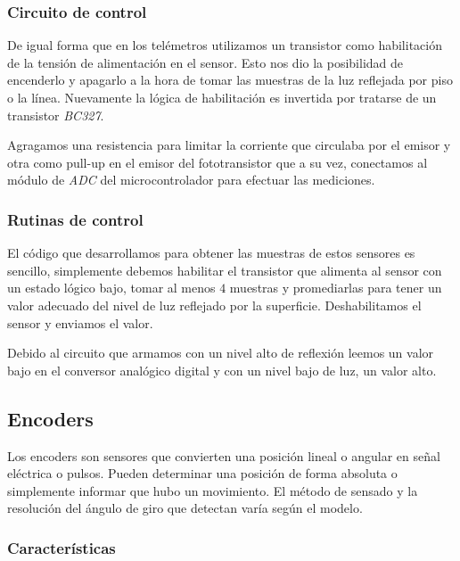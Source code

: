 \subsubsection{Circuito de control}
\label{h_sensado_piso_circuito}

De igual forma que en los tel\'emetros utilizamos un transistor como habilitaci\'on de la tensi\'on de alimentaci\'on en el sensor.
Esto nos dio la posibilidad de encenderlo y apagarlo a la hora de tomar las muestras de la luz reflejada por piso o la l\'inea.
Nuevamente la l\'ogica de habilitaci\'on es invertida por tratarse de un transistor \emph{BC327}.

Agragamos una resistencia para limitar la corriente que circulaba por el emisor y otra como pull-up en el emisor del fototransistor
que a su vez, conectamos al m\'odulo de \emph{ADC} del microcontrolador para efectuar las mediciones.

\subsubsection{Rutinas de control}
\label{h_sensado_piso_rutinas}

El c\'odigo que desarrollamos para obtener las muestras de estos sensores es sencillo, simplemente debemos habilitar el
transistor que alimenta al sensor con un estado l\'ogico bajo, tomar al menos $4$ muestras y promediarlas para tener un
valor adecuado del nivel de luz reflejado por la superficie.
Deshabilitamos el sensor y enviamos el valor.

Debido al circuito que armamos con un nivel alto de reflexi\'on leemos un valor bajo en el conversor anal\'ogico digital y
con un nivel bajo de luz, un valor alto.

\subsection{Encoders}
\label{h_sensado_encoder}

Los encoders son sensores que convierten una posici\'on lineal o angular en se\~nal el\'ectrica o pulsos.
Pueden determinar una posici\'on de forma absoluta o simplemente informar que hubo un movimiento.
El m\'etodo de sensado y la resoluci\'on del \'angulo de giro que detectan var\'ia seg\'un el modelo.

\subsubsection{Caracter\'isticas}
\label{h_sensado_encoder_caracteristicas}

